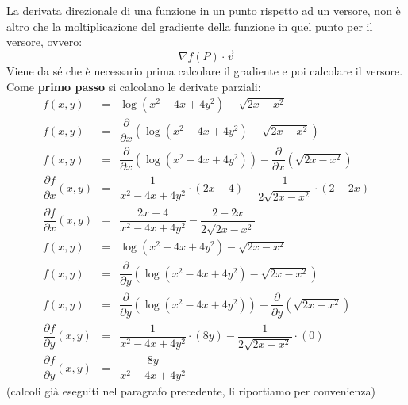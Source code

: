 \documentclass[a4paper]{article}
\begin{document}
	\noindent
	La derivata direzionale di una funzione in un punto rispetto ad un versore, non è altro che la moltiplicazione del gradiente della funzione in quel punto per il versore, ovvero:
	\begin{equation*}
		\nabla f\left(P\right) \cdot \overrightarrow{v}
	\end{equation*}
	Viene da sé che è necessario prima calcolare il gradiente e poi calcolare il versore. Come \textbf{primo passo} si calcolano le derivate parziali:
	\begin{equation*}
		\begin{array}{rcl}
			f\left(x,y\right) &=& \log\left(x^{2} - 4x + 4y^{2}\right) - \sqrt{2x - x^{2}} \\ [.5em]
			f\left(x,y\right) &=& \dfrac{\partial}{\partial x} \left(\log\left(x^{2} - 4x + 4y^{2}\right) - \sqrt{2x - x^{2}}\right) \\ [1.5em]
			f\left(x,y\right) &=& \dfrac{\partial}{\partial x}\left(\log\left(x^{2}-4x+4y^{2}\right)\right) - \dfrac{\partial}{\partial x}\left(\sqrt{2x-x^{2}}\right) \\ [1.5em]
			\dfrac{\partial f}{\partial x}\left(x,y\right) &=& \dfrac{1}{x^{2}-4x+4y^{2}} \cdot \left(2x - 4\right) - \dfrac{1}{2\sqrt{2x-x^{2}}} \cdot \left(2-2x\right) \\ [1.5em]
			\dfrac{\partial f}{\partial x}\left(x,y\right) &=& \dfrac{2x - 4}{x^{2}-4x+4y^{2}} - \dfrac{2-2x}{2\sqrt{2x-x^{2}}} \\ [3em]
			f\left(x,y\right) &=& \log\left(x^{2} - 4x + 4y^{2}\right) - \sqrt{2x - x^{2}} \\ [.5em]
			f\left(x,y\right) &=& \dfrac{\partial}{\partial y} \left(\log\left(x^{2} - 4x + 4y^{2}\right) - \sqrt{2x - x^{2}}\right) \\ [1.5em]
			f\left(x,y\right) &=& \dfrac{\partial}{\partial y}\left(\log\left(x^{2}-4x+4y^{2}\right)\right) - \dfrac{\partial}{\partial y}\left(\sqrt{2x-x^{2}}\right) \\ [1.5em]
			\dfrac{\partial f}{\partial y}\left(x,y\right) &=& \dfrac{1}{x^{2}-4x+4y^{2}} \cdot \left(8y\right) - \dfrac{1}{2\sqrt{2x-x^{2}}} \cdot \left(0\right) \\ [1.5em]
			\dfrac{\partial f}{\partial y}\left(x,y\right) &=& \dfrac{8y}{x^{2} - 4x + 4y^{2}}
		\end{array}
	\end{equation*}
	(calcoli già eseguiti nel paragrafo precedente, li riportiamo per convenienza)\newpage
	
\end{document}
